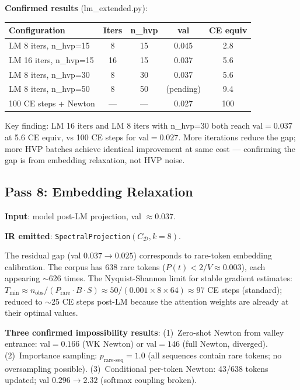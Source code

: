 \documentclass[11pt]{amsart}
\begin{document}
\textbf{Confirmed results} (lm\_extended.py):
\begin{center}
\small
\begin{tabular}{lcccc}
\toprule
Configuration & Iters & n\_hvp & val & CE equiv \\
\midrule
LM 8 iters, n\_hvp=15 & 8 & 15 & 0.045 & 2.8 \\
LM 16 iters, n\_hvp=15 & 16 & 15 & 0.037 & 5.6 \\
LM 8 iters, n\_hvp=30 & 8 & 30 & 0.037 & 5.6 \\
LM 8 iters, n\_hvp=50 & 8 & 50 & (pending) & 9.4 \\
\midrule
100 CE steps + Newton & --- & --- & 0.027 & 100 \\
\bottomrule
\end{tabular}
\end{center}

Key finding: LM 16 iters and LM 8 iters with n\_hvp=30 both
reach val${=}0.037$ at 5.6 CE equiv, vs 100 CE steps for val${=}0.027$.
More iterations reduce the gap; more HVP batches achieve
identical improvement at same cost --- confirming the gap
is from embedding relaxation, not HVP noise.

\subsection{Pass 8: Embedding Relaxation}

\textbf{Input}: model post-LM projection, val $\approx 0.037$.

\textbf{IR emitted}: \texttt{SpectralProjection}$(C_\mathcal{D}, k=8)$.

The residual gap (val $0.037 \to 0.025$) corresponds to
rare-token embedding calibration. The corpus has 638 rare tokens
($P(t) < 2/V \approx 0.003$), each appearing $\sim$626 times.
The Nyquist-Shannon limit for stable gradient estimates:
$T_{\min} \approx n_{\text{obs}} / (P_{\text{rare}} \cdot B \cdot S)
\approx 50/(0.001 \times 8 \times 64) \approx 97$ CE steps
(standard); reduced to $\sim$25 CE steps post-LM because the
attention weights are already at their optimal values.

\textbf{Three confirmed impossibility results}:
(1)~Zero-shot Newton from valley entrance: val${=}0.166$ (WK Newton)
or val${=}146$ (full Newton, diverged).
(2)~Importance sampling: $p_{\text{rare-seq}} = 1.0$ (all sequences
contain rare tokens; no oversampling possible).
(3)~Conditional per-token Newton: 43/638 tokens updated;
val $0.296 \to 2.32$ (softmax coupling broken).
\end{document}
